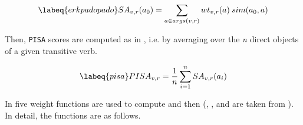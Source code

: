 \begin{equation} \labeq{erkpadopado}
SA_{v,r} (a_0) = \sum_{a \in args(v,r)} wt_{v,r}(a) \: sim(a_0,a)
\end{equation}

Then, \texttt{PISA} scores are computed as in , i.e. by averaging  over the \textit{n} direct objects of a given transitive verb.

\begin{equation} \labeq{pisa}
PISA_{v,r} = \frac{1}{n} \sum_{i = 1}^{n} SA_{v,r} (a_i)
\end{equation}

In \textcite{CappelliLenciPISA} five weight functions are used to compute  and then  (, , and  are taken from \textcite{ErkEtAl2010}). In detail, the functions are as follows.
